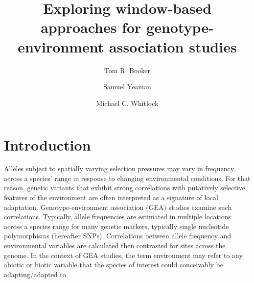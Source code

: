 \documentclass[11pt,twoside,lineno]{GSA_format}
\title{Exploring window-based approaches for genotype-environment association studies}
\author[$\ast$]{Tom R. Booker}
\author[$\dagger$]{Samuel Yeaman}
\author[$\ast$]{Michael C. Whitlock}
\affil[$\ast$]{University of British Columbia}
\affil[$\dagger$]{University of Calgary}
\begin{document}
\maketitle
\marginmark
\firstpagefootnote

\vspace{-33pt}%

\section{Introduction}


Alleles subject to spatially varying selection pressures may vary in frequency across a species' range in response to changing environmental conditions. For that reason, genetic variants that exhibit strong correlations with putatively selective features of the environment are often interpreted as a signature of local adaptation. Genotype-environment association (GEA) studies examine such correlations. Typically, allele frequencies are estimated in multiple locations across a species range for many genetic markers, typically single nucleotide polymorphisms (hereafter SNPs). Correlations between allele frequency and environmental variables are calculated then contrasted for sites across the genome. In the context of GEA studies, the term environment may refer to any abiotic or biotic variable that the species of interest could conceivably be adapting/adapted to. \\
\end{document}
